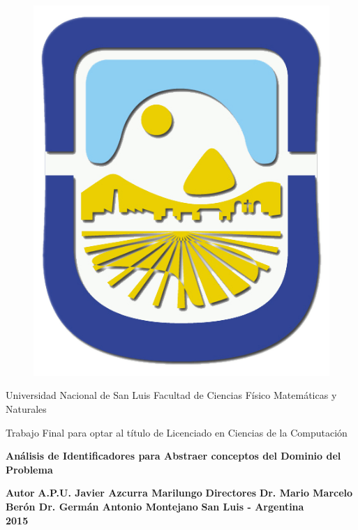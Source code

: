 \enlargethispage{\baselineskip}%
\enlargethispage{\baselineskip}
\enlargethispage{\baselineskip}

\begin{titlepage}

{\bfseries\LARGE\centering

\begin{figure}[h!]
\centerline{%
\includegraphics[scale= 0.15]{./init/unsl_logo.png}} 
\end{figure}  

Universidad Nacional de San Luis
\vskip0.5cm
Facultad de Ciencias Físico Matemáticas y Naturales

}
\vskip1cm  
{\bfseries\normalsize\centering

Trabajo Final para optar al título de Licenciado en Ciencias de la Computación
\vskip0.5cm
}

    \centering
    {\bfseries\LARGE         
	Análisis de Identificadores para Abstraer conceptos del	Dominio del Problema
     \vskip0.8cm       
   }

 {\bfseries\large
	Autor
	\vskip0.1cm   
   }
   {\bfseries\Large
A.P.U. Javier Azcurra Marilungo
   \vskip0.8cm
   }
   {\bfseries\large
	Directores
	\vskip0.1cm   
   }
   {\bfseries\Large
Dr. Mario Marcelo Berón
\vskip0.5cm
Dr. Germán Antonio Montejano
   \vskip1.4cm
}
{\bfseries\normalsize   
   San Luis - Argentina\\
   2015
   }
  

\end{titlepage}
 
